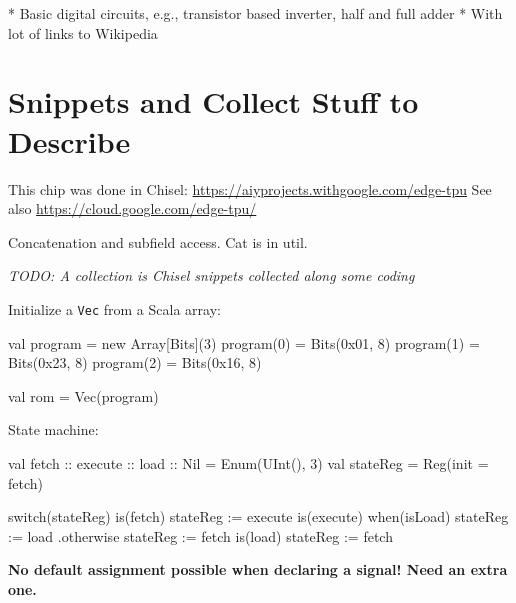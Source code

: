 \documentclass[%
    10pt, %
    headinclude, footexclude,
    openright, %
    notitlepage,
    cleardoubleempty,
    headsepline,
    pointlessnumbers,
    bibtotoc, idxtotoc,
    ]{scrbook}
\newcommand{\code}[1]{{\small{\texttt{#1}}}}
\newcommand{\todo}[1]{{\emph{TODO: #1}}}
\begin{document}
 * Basic digital circuits, e.g., transistor based inverter, half and full adder
 * With lot of links to Wikipedia




\chapter*{Snippets and Collect Stuff to Describe}

This chip was done in Chisel: \url{https://aiyprojects.withgoogle.com/edge-tpu}
See also \url{https://cloud.google.com/edge-tpu/}

Concatenation and subfield access. Cat is in util. 

\todo{A collection is Chisel snippets collected along some coding}

Initialize a \code{Vec} from a Scala array:
\begin{chisel}
  val program = new Array[Bits](3)
  program(0) = Bits(0x01, 8)
  program(1) = Bits(0x23, 8)
  program(2) = Bits(0x16, 8)
    
  val rom = Vec(program)
\end{chisel}

State machine:
\begin{chisel}
  val fetch :: execute :: load :: Nil = Enum(UInt(), 3)
  val stateReg = Reg(init = fetch)

  switch(stateReg) {
    is(fetch) {
      stateReg := execute
    }
    is(execute) {
      when(isLoad) {
        stateReg := load
      }.otherwise {
        stateReg := fetch
      }
    }
    is(load) {
      stateReg := fetch
    }
  }
\end{chisel}

\textbf{No default assignment possible when declaring a signal! Need an extra one.}
\end{document}

